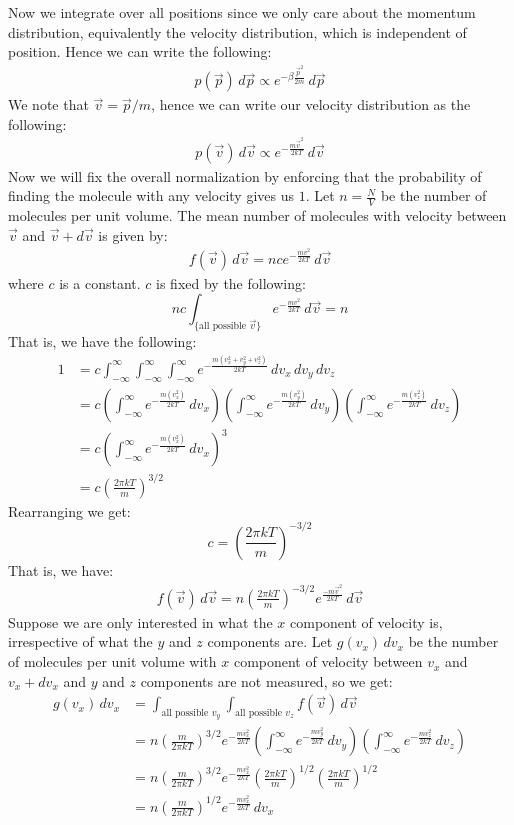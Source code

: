 \documentclass[11pt,oneside]{book}
\theoremstyle{break}
\theoremstyle{break}
\begin{document}
Now we integrate over all positions since we only care about the momentum distribution, equivalently the velocity distribution, which is independent of position. Hence we can write the following:
\begin{align*}
p(\vec{p})\, d\vec{p} \propto e^{-\beta \frac{\vec{p}^2}{2m}} \, d\vec{p}
\end{align*}
We note that $\vec{v} = \vec{p}/m$, hence we can write our velocity distribution as the following:
\begin{align*}
p(\vec{v})\, d\vec{v} \propto e^{-\frac{m\vec{v}^2}{2kT}}\, d\vec{v}
\end{align*}
Now we will fix the overall normalization by enforcing that the probability of finding the molecule with any velocity gives us $1$. Let $n = \frac{N}{V}$ be the number of molecules per unit volume. The mean number of molecules with velocity between $\vec{v}$ and $\vec{v}+d\vec{v}$ is given by:
\begin{align*}
f(\vec{v})\,d\vec{v} = nc e^{-\frac{mv^2}{2kT}}\, d\vec{v}
\end{align*}
where $c$ is a constant. $c$ is fixed by the following:
$$nc \int_{\{\text{all possible } \vec{v}\}}  e^{-\frac{mv^2}{2kT}}\,  d\vec{v}= n$$
That is, we have the following:
\begin{align*}
1&= c \int_{-\infty}^\infty\int_{-\infty}^\infty\int_{-\infty}^\infty e^{-\frac{m(v_x^2+v_y^2+v_z^2)}{2kT}}\, dv_x \,dv_y\, dv_z \\
&=c\left( \int_{-\infty}^\infty e^{-\frac{m(v_x^2)}{2kT}}\, dv_x \right)\left( \int_{-\infty}^\infty e^{-\frac{m(v_y^2)}{2kT}}\, dv_y \right)
\left( \int_{-\infty}^\infty e^{-\frac{m(v_z^2)}{2kT}}\, dv_z \right) \\
&= c\left( \int_{-\infty}^\infty e^{-\frac{m(v_x^2)}{2kT}}\, dv_x \right)^3  \\
&= c\left( \frac{2\pi kT}{m}\right)^{3/2}
\end{align*}
Rearranging we get:
$$c= \left( \frac{2\pi kT}{m}\right)^{-3/2} $$
That is, we have:
\begin{align*}
f(\vec{v}) \, d\vec{v} = n  \left( \frac{2\pi kT}{m}\right)^{-3/2}  e^{\frac{-m\vec{v}^2}{2kT}}\, d\vec{v}
\end{align*}
Suppose we are only interested in what the $x$ component of velocity is, irrespective of what the $y$ and $z$ components are. Let $g(v_x)\, dv_x$ be the number of molecules per unit volume with $x$ component of velocity between $v_x$ and $v_x+dv_x$ and $y$ and $z$ components are not measured, so we get:
\begin{align*}
g(v_x)\,dv_x 
&= \int_{\text{all possible }v_y}\int_{\text{all possible }v_z} f(\vec{v})\, d\vec{v}\\
&= n \left( \frac{m}{2\pi kT}\right)^{3/2} e^{-\frac{mv_x^2}{2kT}}\left( \int_{-\infty}^{\infty}e^{-\frac{mv_y^2}{2kT}}\, dv_y \right)\left( \int_{-\infty}^{\infty}e^{-\frac{mv_z^2}{2kT}}\, dv_z \right)\\
&= n \left( \frac{m}{2\pi kT}\right)^{3/2} e^{-\frac{mv_x^2}{2kT}}\left(\frac{2\pi kT}{m}\right)^{1/2}\left(\frac{2\pi kT}{m}\right)^{1/2}\\
&= n\left( \frac{m}{2\pi kT}\right)^{1/2} e^{-\frac{mv_x^2}{2kT}}\,dv_x
\end{align*}
\end{document}
